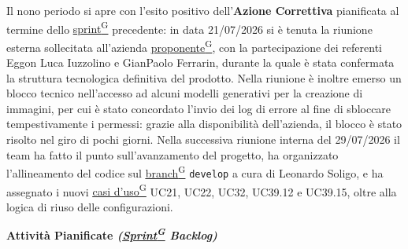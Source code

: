 \documentclass[a4paper,12pt]{article}
\providecommand{\glslink}[2]{\href{https://alittlebyte-19.github.io/Documentazione/glossario.html\#gls-#1}{\underline{#2}\textsuperscript{\scriptsize G}}}
\begin{document}
Il nono periodo si apre con l'esito positivo dell'\textbf{Azione Correttiva} pianificata al termine dello \glslink{sprint}{sprint} precedente: in data 21/07/2026 si è tenuta la riunione esterna sollecitata all'azienda \glslink{committente-proponente}{proponente}, con la partecipazione dei referenti Eggon Luca Iuzzolino e GianPaolo Ferrarin, durante la quale è stata confermata la struttura tecnologica definitiva del prodotto. Nella riunione è inoltre emerso un blocco tecnico nell'accesso ad alcuni modelli generativi per la creazione di immagini, per cui è stato concordato l'invio dei log di errore al fine di sbloccare tempestivamente i permessi: grazie alla disponibilità dell'azienda, il blocco è stato risolto nel giro di pochi giorni. Nella successiva riunione interna del 29/07/2026 il team ha fatto il punto sull'avanzamento del progetto, ha organizzato l'allineamento del codice sul \glslink{branch}{branch} \texttt{develop} a cura di Leonardo Soligo, e ha assegnato i nuovi \glslink{caso-d-uso-uc}{casi d'uso} UC21, UC22, UC32, UC39.12 e UC39.15, oltre alla logica di riuso delle configurazioni.

\begin{center}
\noindent\textbf{Attività Pianificate \textit{(\glslink{sprint}{Sprint} Backlog)}}\\
\end{center}
\end{document}
